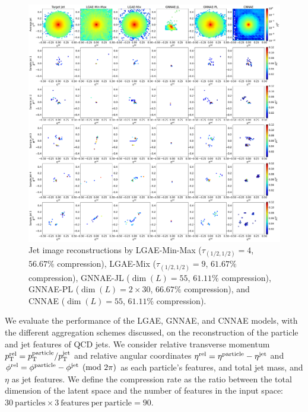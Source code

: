 \begin{figure}[ht!]
    \centering
    \includegraphics[width=\linewidth]{figures/06-ML4Jets/lgae/reconstructions/jet_images-cnnae.pdf}
    \caption[Jet image reconstructions.]{Jet image reconstructions by
        LGAE-Min-Max ($\tau_{(1/2, 1/2)}=4$, $56.67\%$ compression),
        LGAE-Mix ($\tau_{(1/2, 1/2)}=9$, $61.67\%$ compression),
        GNNAE-JL ($\dim(L) = 55$, $61.11\%$ compression), 
        GNNAE-PL ($\dim(L) = 2\times 30$, $66.67\%$ compression), and CNNAE ($\dim(L) = 55$, $61.11\%$ compression).
    }
    \label{fig:06_lgae_recons-jet-imgs}
\end{figure}


We evaluate the performance of the LGAE, GNNAE, and CNNAE models, with the different aggregation schemes discussed, on the reconstruction of the particle and jet features of QCD jets.  
We consider relative transverse momentum
$p_\mathrm{T}^\mathrm{rel} = p_\mathrm{T}^\mathrm{particle}/p_\mathrm{T}^\mathrm{jet}$ and relative angular coordinates
$\eta^\mathrm{rel} =\eta^\mathrm{particle} - \eta^\mathrm{jet}$ and
$\phi^\mathrm{rel} =\phi^\mathrm{particle} - \phi^\mathrm{jet} \pmod{2\pi}$
as each particle's features, and total jet mass, \pt and $\eta$ as jet features. 
We define the compression rate as the ratio between the total dimension of the latent space and the number of features in the input space: $30\ \mathrm{particles} \times 3\ \mathrm{features\ per\ particle} = 90$.


